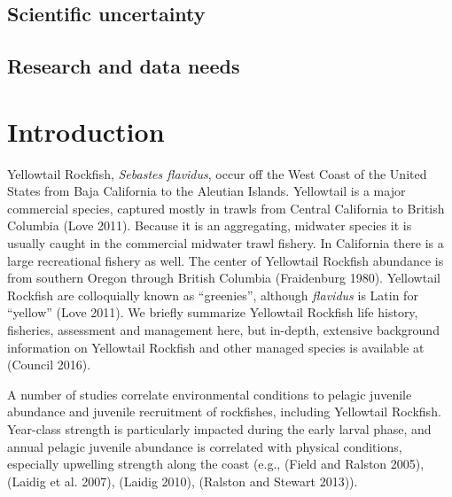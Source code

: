 \documentclass[
]{scrartcl}
\begin{document}
\clearpage

\clearpage

\hypertarget{scientific-uncertainty}{%
\subsection*{Scientific uncertainty}\label{scientific-uncertainty}}

\hypertarget{research-and-data-needs}{%
\subsection*{Research and data needs}\label{research-and-data-needs}}

\newpage{}

\setlength{\parskip}{5mm plus1mm minus1mm}
\setcounter{page}{1}
\setcounter{section}{0}
\renewcommand{\thefigure}{\arabic{figure}}
\renewcommand{\thetable}{\arabic{table}}
\setcounter{table}{0}
\setcounter{figure}{0}

\hypertarget{introduction}{%
\section{Introduction}\label{introduction}}

Yellowtail Rockfish, \emph{Sebastes flavidus}, occur off the West Coast
of the United States from Baja California to the Aleutian Islands.
Yellowtail is a major commercial species, captured mostly in trawls from
Central California to British Columbia (Love 2011). Because it is an
aggregating, midwater species it is usually caught in the commercial
midwater trawl fishery. In California there is a large recreational
fishery as well. The center of Yellowtail Rockfish abundance is from
southern Oregon through British Columbia (Fraidenburg 1980). Yellowtail
Rockfish are colloquially known as ``greenies'', although
\emph{flavidus} is Latin for ``yellow'' (Love 2011). We briefly
summarize Yellowtail Rockfish life history, fisheries, assessment and
management here, but in-depth, extensive background information on
Yellowtail Rockfish and other managed species is available at (Council
2016).

A number of studies correlate environmental conditions to pelagic
juvenile abundance and juvenile recruitment of rockfishes, including
Yellowtail Rockfish. Year-class strength is particularly impacted during
the early larval phase, and annual pelagic juvenile abundance is
correlated with physical conditions, especially upwelling strength along
the coast (e.g., (Field and Ralston 2005), (Laidig et al. 2007), (Laidig
2010), (Ralston and Stewart 2013)).
\end{document}
